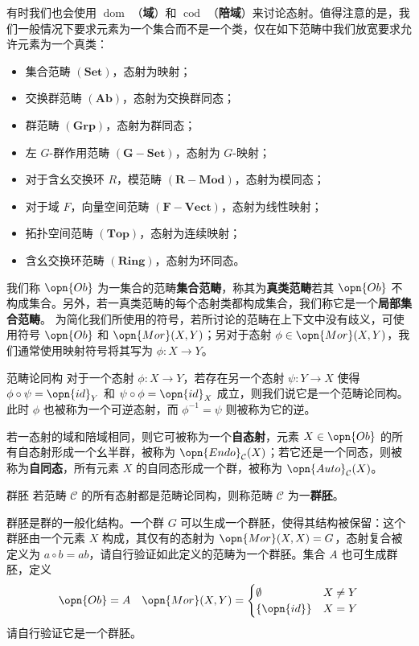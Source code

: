 有时我们也会使用 $\operatorname{dom}$ （\textbf{域}）和 $\operatorname{cod}$ （\textbf{陪域}）来讨论态射。值得注意的是，我们一般情况下要求元素为一个集合而不是一个类，仅在如下范畴中我们放宽要求允许元素为一个真类：
\begin{itemize}
    \item 集合范畴 $(\mathbf{Set})$，态射为映射；
    \item 交换群范畴 $(\mathbf{Ab})$，态射为交换群同态；
    \item 群范畴 $(\mathbf{Grp})$，态射为群同态；
    \item 左 $G$-群作用范畴 $(\mathbf{G{-}Set})$，态射为 $G$-映射；
    \item 对于含幺交换环 $R$，模范畴 $(\mathbf{R{-}Mod})$，态射为模同态；
    \item 对于域 $F$，向量空间范畴 $(\mathbf{F{-}Vect})$，态射为线性映射；
    \item 拓扑空间范畴 $(\mathbf{Top})$，态射为连续映射；
    \item 含幺交换环范畴 $(\mathbf{Ring})$，态射为环同态。
\end{itemize}
我们称 $\opn{Ob}$ 为一集合的范畴\textbf{集合范畴}，称其为\textbf{真类范畴}若其 $\opn{Ob}$ 不构成集合。另外，若一真类范畴的每个态射类都构成集合，我们称它是一个\textbf{局部集合范畴}。
为简化我们所使用的符号，若所讨论的范畴在上下文中没有歧义，可使用符号 $\opn{Ob}$ 和 $\opn{Mor}(X,Y)$；另对于态射 $\phi\in\opn{Mor}(X,Y)$，我们通常使用映射符号将其写为 $\phi:X\to Y$。

\begin{definition}{范畴论同构}
对于一个态射 $\phi:X\to Y$，若存在另一个态射 $\psi:Y\to X$ 使得 $\phi\circ\psi=\opn{id}_Y$ 和 $\psi\circ\phi=\opn{id}_X$ 成立，则我们说它是一个范畴论同构。此时 $\phi$ 也被称为一个可逆态射，而 $\phi^{-1}=\psi$ 则被称为它的逆。
\end{definition}
若一态射的域和陪域相同，则它可被称为一个\textbf{自态射}，元素 $X\in\opn{Ob}$ 的所有自态射形成一个幺半群，被称为 $\opn{Endo}_\mathcal{C}(X)$；若它还是一个同态，则被称为\textbf{自同态}，所有元素 $X$ 的自同态形成一个群，被称为 $\opn{Auto}_\mathcal{C}(X)$。

\begin{definition}{群胚}
若范畴 $\mathcal{C}$ 的所有态射都是范畴论同构，则称范畴 $\mathcal{C}$ 为一\textbf{群胚}。
\end{definition}
群胚是群的一般化结构。一个群 $G$ 可以生成一个群胚，使得其结构被保留：这个群胚由一个元素 $X$ 构成，其仅有的态射为 $\opn{Mor}(X,X)=G$，态射复合被定义为 $a\circ b=ab$，请自行验证如此定义的范畴为一个群胚。集合 $A$ 也可生成群胚，定义
\begin{equation}
\opn{Ob}=A\quad\opn{Mor}(X,Y)=\begin{cases}\emptyset&X\neq Y\\\{\opn{id}\}&X=Y\end{cases}
\end{equation}
请自行验证它是一个群胚。

